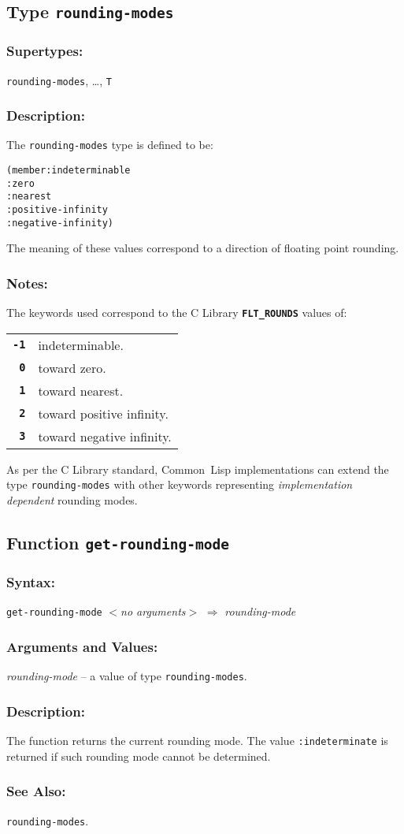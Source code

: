 \documentclass[10pt,fleqn]{article}
\newcommand{\CL}{\textsf{Common~Lisp}}
\newcommand{\CLang}{\textsf{C}}
\newcommand{\code}[1]{\texttt{#1}}
\newcommand{\varname}[1]{\textit{#1}}
\newcommand{\DDictionaryItem}[1]{\vspace*{6pt}\noindent\hrulefill\vspace*{-9pt}\subsection*{#1}}
\newcommand{\DSyntax}{\subsubsection*{Syntax:}}
\newcommand{\DSupertypes}{\subsubsection*{Supertypes:}}
\newcommand{\DArgsNValues}{\subsubsection*{Arguments and Values:}}
\newcommand{\DDescription}{\subsubsection*{Description:}}
\newcommand{\DNotes}{\subsubsection*{Notes:}}
\newcommand{\DSeeAlso}{\subsubsection*{See Also:}}
\begin{document}
\DDictionaryItem{Type \code{rounding-modes}}

\DSupertypes{}

\code{rounding-modes}, \ldots, \code{T}

\DDescription{}

The \code{rounding-modes} type is defined to be:
\begin{alltt}
(member :indeterminable
        :zero
        :nearest
        :positive-infinity
        :negative-infinity)
\end{alltt}
The meaning of these values correspond to a direction of floating
point rounding.


\DNotes{}

The keywords used correspond to the \CLang{} Library \cite{C18}
\textbf{\code{FLT\_ROUNDS}} values of:

\vspace*{3mm}

\begin{tabular}{rl}
  \textbf{\code{-1}} & indeterminable.\\
  \textbf{\code{0}}  & toward zero.\\
  \textbf{\code{1}}  & toward nearest.\\
  \textbf{\code{2}}  & toward positive infinity.\\
  \textbf{\code{3}}  & toward negative infinity.\\
\end{tabular}

\vspace*{3mm}

As per the \CLang{} Library standard, \CL{} implementations can extend the
type \code{rounding-modes} with other keywords representing
\emph{implementation dependent} rounding modes.


\DDictionaryItem{Function \code{get-rounding-mode}}

\DSyntax{}

\code{get-rounding-mode} \textit{$<$no arguments$>$}
$\Rightarrow$ \varname{rounding-mode}

\DArgsNValues{}

\varname{rounding-mode} -- a value of type \code{rounding-modes}.

\DDescription{}

The function returns the current rounding mode.  The value
\code{:indeterminate} is returned if such rounding mode cannot be
determined.

\DSeeAlso{}

 \code{rounding-modes}.
\end{document}
